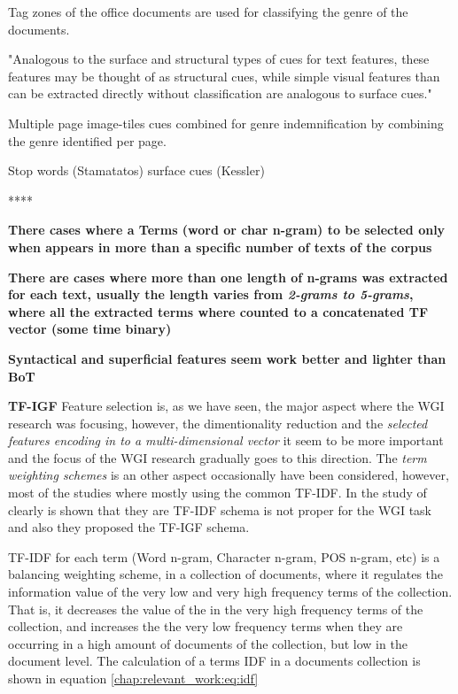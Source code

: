 Tag zones of the office documents are used for classifying the genre of the documents.

"Analogous to the surface and structural types of cues for text features, these features may be thought of as structural cues, while simple visual features than can be extracted directly without classification are analogous to surface cues."

Multiple page image-tiles cues combined for genre indemnification by combining the genre identified per page.

Stop words (Stamatatos) surface cues (Kessler)

****

\textbf{There cases where a Terms (word or char n-gram) to be selected only when appears in more than a specific number of texts of the corpus}

\textbf{There are cases where more than one length of n-grams was extracted for each text, usually the length varies from \textit{2-grams to 5-grams}, where all the extracted terms where counted to a concatenated TF vector (some time binary)}

\textbf{Syntactical and superficial features seem work better and lighter than BoT}

 \textbf{TF-IGF } Feature selection is, as we have seen, the major aspect where the WGI research was focusing, however, the dimentionality reduction and the \textit{selected features encoding in to a multi-dimensional vector} it seem to be more important and the focus of the WGI research gradually goes to this direction. The \textit{term weighting schemes} is an other aspect occasionally have been considered, however, most of the studies where mostly using the common TF-IDF. In the study of \parencite{sugiyanto2014term} clearly is shown that they are TF-IDF schema is not proper for the WGI task and also they proposed the TF-IGF schema. 
 
 TF-IDF for each term (Word n-gram, Character n-gram, POS n-gram, etc) is a balancing weighting scheme, in a collection of documents, where it regulates the information value of the very low and very high frequency terms of the collection. That is, it decreases the value of the in the very high frequency terms of the collection, and increases the the very low frequency terms when they are occurring in a high amount of documents of the collection, but low in the document level. The calculation of a terms IDF in a documents collection is shown in equation \ref{chap:relevant_work:eq:idf}
 
